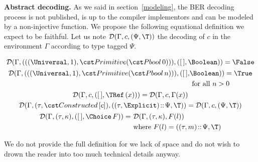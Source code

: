 \medskip

\textbf{Abstract decoding.} As we said in section~\ref{modeling}, the
BER decoding process is not published, is up to the \ASN compiler
implementors and can be modeled by a non\hyp{}injective function. We
propose the following equational definition we expect to be
faithful. Let us note $\decoding{\Gamma}{c}{(\Psi,\T)}$ the decoding
of $c$ in the environment $\Gamma$ according to type \T{} tagged
$\Psi$.

\begin{gather*}
\decoding{\Gamma}{(((\Universal,1), \Primitive (\Pbool \,
0)))}{([\,],\Boolean)} = \False\\
\begin{align*}
\decoding{\Gamma}{(((\Universal,1), \Primitive (\Pbool \,
n)))}{([\,],&\Boolean)} = \True\\
& \ \textnormal{for all} \ n > 0
\end{align*}\\
\decoding{\Gamma}{c}{([\,],\TRef \, (x))} = \decoding{\Gamma}{c}{\Gamma(x)}\\
\decoding{\Gamma}{(\tau,\Constructed \,
  [c])}{((\tau,\Explicit)\!::\!\Psi,\T)} =
\decoding{\Gamma}{c}{(\Psi,\T)}\\
\begin{align*}
\decoding{\Gamma}{(\tau,\kappa)}{([\,],\Choice \, F)} = & \ 
\decoding{\Gamma}{(\tau,\kappa)}{F(l)}\\
& \ \textnormal{where} \ F(l) = ((\tau,m)\!::\!\Psi,\T) 
\end{align*}
\end{gather*}

We do not provide the full definition for we lack of space and do not
wish to drown the reader into too much technical details anyway.
